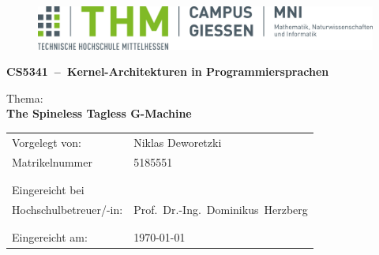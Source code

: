 \documentclass[12pt]{report}
\newcommand{\MyName}{Niklas Deworetzki}
\newcommand{\MyTitle}{CS5341~--~Kernel-Architekturen in Programmiersprachen}
\newcommand{\MyTopic}{The Spineless Tagless G-Machine}        %
\renewcommand\_{\textunderscore\allowbreak}
\begin{document}
\pagestyle{empty}


\begin{titlepage}
  \begin{center}
    \begin{figure}
      \includegraphics[width=.9\textwidth]{LOGO_THM_CG_FB06}
    \end{figure}
  \end{center}
  \Large
  \begin{center}
    \vspace{1cm}
    \textbf{\MyTitle{}}\linebreak
    \vspace{1cm}
  \end{center}
  \large
  Thema:\\
  \textbf{\MyTopic{}}

  \normalsize
  \vfill
  \begin{center}
    \begin{tabular*}{0.75\textwidth}%
      {@{\extracolsep{\fill}}ll}

      {Vorgelegt von:} & {\MyName{}}\\
      {Matrikelnummer} & {5185551}\\
      {} & {}\\
      {} & {}\\
      {Eingereicht bei} & {}\\
      {Hochschulbetreuer/-in:} & {Prof.\ Dr.-Ing.\ Dominikus\ Herzberg}\\
      {} & {}\\
      {} & {}\\
      {Eingereicht am:} & {\today}

    \end{tabular*}
  \end{center}

  \vfill
\end{titlepage}

\addtocounter{page}{1}
\pagestyle{fancy}

\tableofcontents
\end{document}
